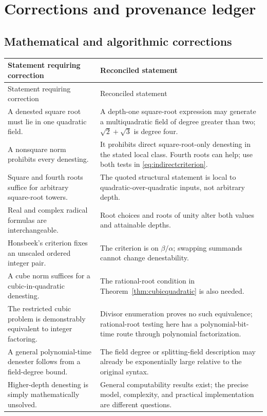 \documentclass[11pt,letterpaper]{article}
\numberwithin{equation}{section}
\theoremstyle{definition}
\theoremstyle{remark}
\begin{document}
\section{Corrections and provenance ledger}\label{sec:corrections}

\subsection{Mathematical and algorithmic corrections}
\begin{longtable}{@{}p{}p{}@{}}
\toprule
Statement requiring correction & Reconciled statement\\
\midrule\endfirsthead
\toprule Statement requiring correction & Reconciled statement\\\midrule\endhead
\bottomrule\endfoot
A denested square root must lie in one quadratic field. & A depth-one square-root expression may generate a multiquadratic field of degree greater than two; $\sqrt2+\sqrt3$ is degree four.\\[5pt]
A nonsquare norm prohibits every denesting. & It prohibits direct square-root-only denesting in the stated local class. Fourth roots can help; use both tests in \eqref{eq:indirectcriterion}.\\[5pt]
Square and fourth roots suffice for arbitrary square-root towers. & The quoted structural statement is local to quadratic-over-quadratic inputs, not arbitrary depth.\\[5pt]
Real and complex radical formulas are interchangeable. & Root choices and roots of unity alter both values and attainable depths.\\[5pt]
Honsbeek's criterion fixes an unscaled ordered integer pair. & The criterion is on $\beta/\alpha$; swapping summands cannot change denestability.\\[5pt]
A cube norm suffices for a cubic-in-quadratic denesting. & The rational-root condition in Theorem~\ref{thm:cubicquadratic} is also needed.\\[5pt]
The restricted cubic problem is demonstrably equivalent to integer factoring. & Divisor enumeration proves no such equivalence; rational-root testing here has a polynomial-bit-time route through polynomial factorization.\\[5pt]
A general polynomial-time denester follows from a field-degree bound. & The field degree or splitting-field description may already be exponentially large relative to the original syntax.\\[5pt]
Higher-depth denesting is simply mathematically unsolved. & General computability results exist; the precise model, complexity, and practical implementation are different questions.\\[5pt]

\end{longtable}
\end{document}
